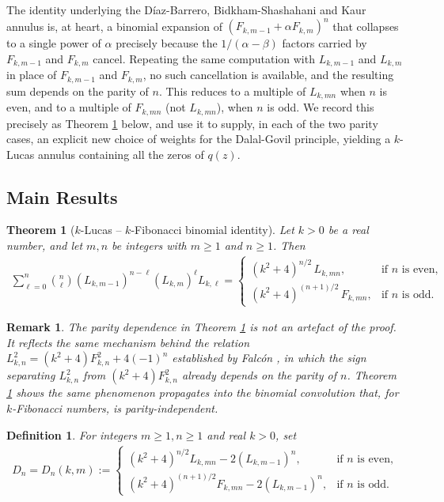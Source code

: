 \documentclass[11pt,a4paper]{article}
\newtheorem{theorem}{Theorem}[section]
\newtheorem{remark}{Remark}[section]
\newtheorem{definition}{Definition}[section]
\numberwithin{equation}{section}
\numberwithin{table}{section}
\numberwithin{figure}{section}
\begin{document}
The identity underlying the D\'iaz-Barrero, Bidkham-Shashahani and Kaur annulus is, at heart, a binomial expansion of $(F_{k,m-1}+\alpha F_{k,m})^n$ that collapses to a single power of $\alpha$ precisely because the $1/(\alpha-\beta)$ factors carried by $F_{k,m-1}$ and $F_{k,m}$ cancel. Repeating the same computation with $L_{k,m-1}$ and $L_{k,m}$ in place of $F_{k,m-1}$ and $F_{k,m}$, no such cancellation is available, and the resulting sum depends on the parity of $n$. This reduces to a multiple of $L_{k,mn}$ when $n$ is even, and to a multiple of $F_{k,mn}$ (not $L_{k,mn}$), when $n$ is odd. We record this precisely as Theorem \ref{thm:main} below, and use it to supply, in each of the two parity cases, an explicit new choice of weights for the Dalal-Govil principle, yielding a $k$-Lucas annulus containing all the zeros of $q(z)$.

	
\subsection{Main Results}

\begin{theorem}[$k$-Lucas -- $k$-Fibonacci binomial identity]
	\label{thm:main}
	Let $k>0$ be a real number, and let $m,n$ be integers with $m\ge 1$ and $n\ge1$. Then
 \begin{align*}
	\sum_{\ell=0}^{n}\binom{n}{\ell}(L_{k,m-1})^{n-\ell}(L_{k,m})^{\ell}L_{k,\ell}
	=
	\begin{cases}
		(k^2+4)^{n/2}\,L_{k,mn}, & \text{if } n \text{ is even},\\[6pt]
		(k^2+4)^{(n+1)/2}\,F_{k,mn}, & \text{if } n \text{ is odd}.
	\end{cases}
 \end{align*}
\end{theorem}

\begin{remark}
	The parity dependence in Theorem \ref{thm:main} is not an artefact of the proof. It reflects the same mechanism behind the relation $L_{k,n}^2=(k^2+4)F_{k,n}^2+4(-1)^n$ established by Falc\'on \cite{falconlucas}, in which the sign separating $L_{k,n}^2$ from $(k^2+4)F_{k,n}^2$ already depends on the parity of $n$. Theorem \ref{thm:main} shows the same phenomenon propagates into the binomial convolution that, for $k$-Fibonacci numbers, is parity-independent.
\end{remark}
	
\begin{definition}
	\label{def:Dn}
	For integers $m\ge1,n\ge1$ and real $k>0$, set
 \begin{align*}
	D_n=D_n(k,m):=
	\begin{cases}
		(k^2+4)^{n/2}L_{k,mn}-2(L_{k,m-1})^n, & \text{if } n \text{ is even},\\[6pt]
		(k^2+4)^{(n+1)/2}F_{k,mn}-2(L_{k,m-1})^n, & \text{if } n \text{ is odd}.
	\end{cases}
 \end{align*}
\end{definition}
\end{document}
